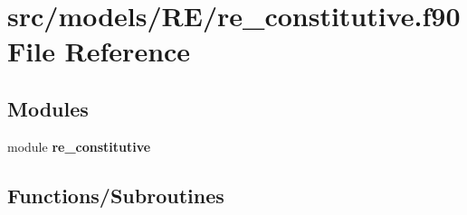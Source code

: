 \section{src/models/\+R\+E/re\+\_\+constitutive.f90 File Reference}
\label{re__constitutive_8f90}
\subsection*{Modules}
\begin{DoxyCompactItemize}
\item 
module {\bf re\+\_\+constitutive}
\end{DoxyCompactItemize}
\subsection*{Functions/\+Subroutines}
